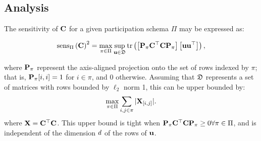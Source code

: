 \documentclass{article}
\begin{document}
\subsection{Analysis}
\label{app:analysis}
\begin{prop}\label{prop:trace_sens}

The sensitivity of $\mathbf{C}$ for a given participation schema $\Pi$ may be expressed as:

\begin{equation}\label{eq:trace_norm_rep}
    \operatorname{sens}_\Pi\left(\mathbf{C}\right)^2 = \max_{\pi \in \Pi} \sup_{\mathbf{u} \in \mathfrak{D}} \mathrm{tr}\left( \left[\mathbf{P}_\pi \mathbf{C}^\top\mathbf{C} \mathbf{P}_\pi \right]\left[\mathbf{u} \mathbf{u}^\top\right]\right),
\end{equation}

where $\mathbf{P}_\pi$ represent the axis-aligned projection onto the set of rows indexed by $\pi$; that is, $\mathbf{P}_\pi[i, i] = 1$ for $i \in \pi$, and $0$ otherwise. Assuming that $\mathfrak{D}$ represents a set of matrices with rows bounded by $\ell_2$ norm 1, this can be upper bounded by:
\[ 
\max_{\pi \in \Pi} \sum_{i,j \in \pi} | \mathbf{X}_{[i,j]} |.
\]
where $\mathbf{X} = \mathbf{C}^\top \mathbf{C}$.  This upper bound is tight when $\mathbf{P}_\pi \mathbf{C}^\top\mathbf{C} \mathbf{P}_\pi \geq 0 \forall \pi \in \Pi$, and is independent of the dimension $d$ of the rows of $\mathbf{u}$.

\end{prop}
\end{document}
